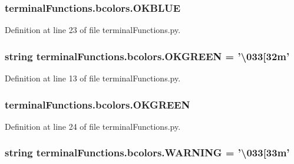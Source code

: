 \subsubsection[{O\-K\-B\-L\-U\-E}]{\setlength{\rightskip}{0pt plus 5cm}terminal\-Functions.\-bcolors.\-O\-K\-B\-L\-U\-E}\label{classterminalFunctions_1_1bcolors_aed2d2a9a28de0cada29ff01166af9df8}


Definition at line 23 of file terminal\-Functions.\-py.

\subsubsection[{O\-K\-G\-R\-E\-E\-N}]{\setlength{\rightskip}{0pt plus 5cm}string terminal\-Functions.\-bcolors.\-O\-K\-G\-R\-E\-E\-N = '\textbackslash{}033\mbox{[}32m'\hspace{0.3cm}{\ttfamily [static]}}\label{classterminalFunctions_1_1bcolors_a4e375485a94ea38094b946fae2636c5d}


Definition at line 13 of file terminal\-Functions.\-py.

\subsubsection[{O\-K\-G\-R\-E\-E\-N}]{\setlength{\rightskip}{0pt plus 5cm}terminal\-Functions.\-bcolors.\-O\-K\-G\-R\-E\-E\-N}\label{classterminalFunctions_1_1bcolors_a62488aca613ba27f27a4725bbf1a5a26}


Definition at line 24 of file terminal\-Functions.\-py.

\subsubsection[{W\-A\-R\-N\-I\-N\-G}]{\setlength{\rightskip}{0pt plus 5cm}string terminal\-Functions.\-bcolors.\-W\-A\-R\-N\-I\-N\-G = '\textbackslash{}033\mbox{[}33m'\hspace{0.3cm}{\ttfamily [static]}}\label{classterminalFunctions_1_1bcolors_a36c27269ab26e0af1e7c32ec1bc30806}


